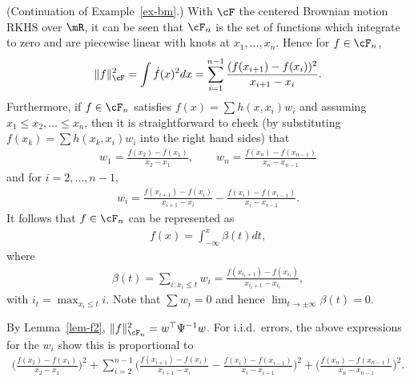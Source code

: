 \documentclass[preprint,12pt,authoryear]{elsarticle}
\DeclarePairedDelimiter{\norm}{\lVert}{\rVert}
\begin{document}
\begin{example}\label{ex-smooth}
	(Continuation of Example~\ref{ex-bm}.)
	With $\cF$ the centered Brownian motion RKHS over $\mR$, it can be seen that $\cF_n$ is the set of functions which integrate to zero and are piecewise linear with knots at $x_1,\ldots,x_n$.
	Hence for $f\in\cF_n$,
	\[ \norm{f}_{\cF}^2 = \int \dot f(x)^2dx = \sum_{i=1}^{n-1}\frac{(f(x_{i+1})-f(x_i))^2}{x_{i+1}-x_i} . \]
	Furthermore, if $f\in\cF_n$ satisfies $f(x)=\sum h(x,x_i)w_i$ and assuming $x_1\le x_2,\ldots\le x_n$, then it is straightforward to check (by substituting $f(x_k)=\sum h(x_k,x_i)w_i$ into the right hand sides) that
	\begin{eqnarray*}
		w_1 = \frac{f(x_{2})-f(x_{1})}{x_{2}-x_{1}}, \quad\quad w_n = \frac{f(x_{n})-f(x_{n-1})}{x_{n}-x_{n-1}}
	\end{eqnarray*}
	and for $i=2,\ldots,n-1$,
	\begin{eqnarray*}
		w_i = \frac{f(x_{i+1})-f(x_{i})}{x_{i+1}-x_{i}} - \frac{f(x_{i})-f(x_{i-1})}{x_{i}-x_{i-1}}.
	\end{eqnarray*}
	It follows that $f\in\cF_n$ can be represented as
	\begin{align}\label{fint}
	f(x) = \int_{-\infty}^x \beta(t)dt ,
	\end{align}
	where
	\begin{align}\label{betadif}
	\beta(t) = \sum_{i:x_i\le t}w_i = \frac{f(x_{i_t+1})-f(x_{i_t})}{x_{i_t+1}-x_{i_t}}, 
	\end{align}
	with $i_t=\max_{x_i\le t}i$. Note that $\sum w_i=0$ and hence $\lim_{t\rightarrow\pm\infty}\beta(t)=0$.
	
	By Lemma~\ref{lem-f2}, $\norm{f}_{\cF_n}^2=w^\top\Psi^{-1}w$. For i.i.d.\  errors, the above expressions for the $w_i$ show this is proportional to
	\begin{align}\label{pen} \Big(\frac{f(x_{2})-f(x_{1})}{x_{2}-x_{1}}\Big)^2 + 
	\sum_{i=2}^{n-1} \Big(\frac{f(x_{i+1})-f(x_{i})}{x_{i+1}-x_{i}} - \frac{f(x_{i})-f(x_{i-1})}{x_{i}-x_{i-1}}\Big)^2
	+ \Big(\frac{f(x_{n})-f(x_{n-1})}{x_{n}-x_{n-1}}\Big)^2. 
	\end{align}
\end{example}
\end{document}
